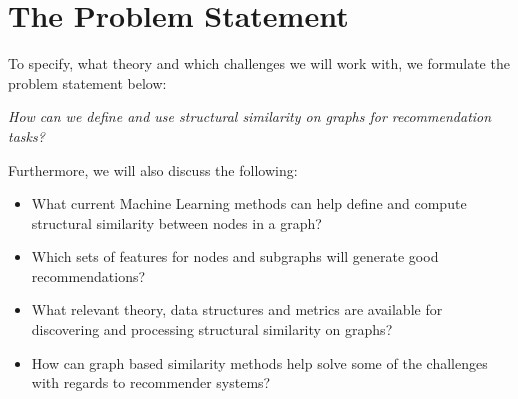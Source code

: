 \section{The Problem Statement}
  To specify, what theory and which challenges we will work with, we formulate the problem statement below:
  \begin{center}
    \textit{How can we define and use structural similarity on graphs for recommendation tasks?}
  \end{center}

  Furthermore, we will also discuss the following:
  \begin{itemize}
    \item What current Machine Learning methods can help define and compute structural similarity between nodes in a graph?
    \item Which sets of features for nodes and subgraphs will generate good recommendations?
    \item What relevant theory, data structures and metrics are available for discovering and processing structural similarity on graphs?
    \item How can graph based similarity methods help solve some of the challenges with regards to recommender systems?
  \end{itemize}
